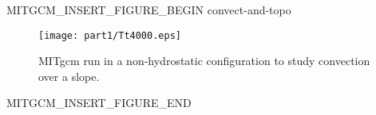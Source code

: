 \begin{rawhtml}MITGCM_INSERT_FIGURE_BEGIN convect-and-topo\end{rawhtml}
\begin{figure}
\begin{center}
  \texttt{[image: part1/Tt4000.eps]}
\end{center}
\caption{MITgcm run in a non-hydrostatic configuration
to study convection over a slope.}
\label{fig:convect-and-topo}
\end{figure}
\begin{rawhtml}MITGCM_INSERT_FIGURE_END\end{rawhtml}
